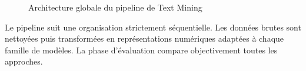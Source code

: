 \begin{figure}[H]
\caption{Architecture globale du pipeline de Text Mining}
\label{fig:architecture}
\end{figure}

Le pipeline suit une organisation strictement séquentielle. Les données brutes sont nettoyées
puis transformées en représentations numériques adaptées à chaque famille de modèles.
La phase d'évaluation compare objectivement toutes les approches.
